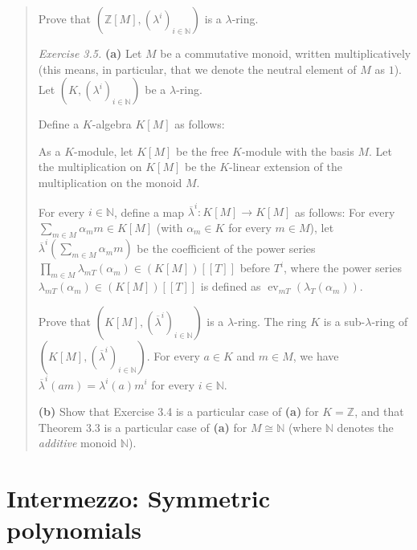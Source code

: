 \documentclass[numbers=enddot,12pt,final,onecolumn,notitlepage]{scrartcl}%
\begin{document}
\begin{quotation}
Prove that $\left(  \mathbb{Z}\left[  M\right]  ,\left(  \lambda^{i}\right)
_{i\in\mathbb{N}}\right)  $ is a $\lambda$-ring.

\textit{Exercise 3.5.} \textbf{(a)} Let $M$ be a commutative monoid, written
multiplicatively (this means, in particular, that we denote the neutral
element of $M$ as $1$). Let $\left(  K,\left(  \lambda^{i}\right)
_{i\in\mathbb{N}}\right)  $ be a $\lambda$-ring.

Define a $K$-algebra $K\left[  M\right]  $ as follows:

As a $K$-module, let $K\left[  M\right]  $ be the free $K$-module with the
basis $M$. Let the multiplication on $K\left[  M\right]  $ be the $K$-linear
extension of the multiplication on the monoid $M$.

For every $i\in\mathbb{N}$, define a map $\overline{\lambda}^{i}:K\left[
M\right]  \rightarrow K\left[  M\right]  $ as follows: For every
$\sum\limits_{m\in M}\alpha_{m}m\in K\left[  M\right]  $ (with $\alpha_{m}\in
K$ for every $m\in M$), let $\overline{\lambda}^{i}\left(  \sum\limits_{m\in
M}\alpha_{m}m\right)  $ be the coefficient of the power series $\prod
\limits_{m\in M}\lambda_{mT}\left(  \alpha_{m}\right)  \in\left(  K\left[
M\right]  \right)  \left[  \left[  T\right]  \right]  $ before $T^{i}$, where
the power series $\lambda_{mT}\left(  \alpha_{m}\right)  \in\left(  K\left[
M\right]  \right)  \left[  \left[  T\right]  \right]  $ is defined as
$\operatorname*{ev}_{mT}\left(  \lambda_{T}\left(  \alpha_{m}\right)  \right)
$.

Prove that $\left(  K\left[  M\right]  ,\left(  \overline{\lambda}^{i}\right)
_{i\in\mathbb{N}}\right)  $ is a $\lambda$-ring. The ring $K$ is a
sub-$\lambda$-ring of $\left(  K\left[  M\right]  ,\left(  \overline{\lambda
}^{i}\right)  _{i\in\mathbb{N}}\right)  $. For every $a\in K$ and $m\in M$, we
have $\overline{\lambda}^{i}\left(  am\right)  =\lambda^{i}\left(  a\right)
m^{i}$ for every $i\in\mathbb{N}$.

\textbf{(b)} Show that Exercise 3.4 is a particular case of \textbf{(a)} for
$K=\mathbb{Z}$, and that Theorem 3.3 is a particular case of \textbf{(a)} for
$M\cong\mathbb{N}$ (where $\mathbb{N}$ denotes the \textit{additive} monoid
$\mathbb{N}$).
\end{quotation}

\section{Intermezzo: Symmetric polynomials}
\end{document}
